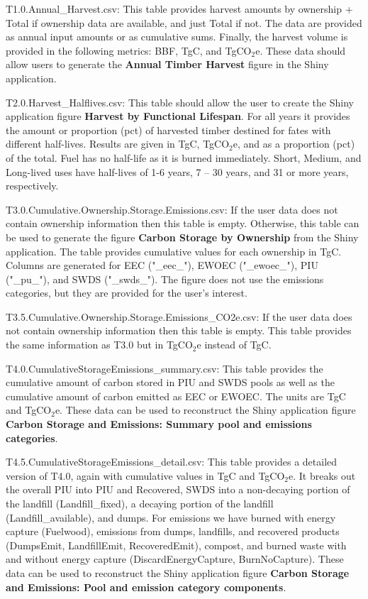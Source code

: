 \documentclass[
  openany]{book}
\begin{document}
T1.0.Annual\_Harvest.csv: This table provides harvest amounts by
ownership + Total if ownership data are available, and just Total if
not. The data are provided as annual input amounts or as cumulative
sums. Finally, the harvest volume is provided in the following metrics:
BBF, TgC, and TgCO\(_2\)e. These data should allow users to generate the
\textbf{Annual Timber Harvest} figure in the Shiny application.

T2.0.Harvest\_Halflives.csv: This table should allow the user to create
the Shiny application figure \textbf{Harvest by Functional Lifespan}.
For all years it provides the amount or proportion (pct) of harvested
timber destined for fates with different half-lives. Results are given
in TgC, TgCO\(_2\)e, and as a proportion (pct) of the total. Fuel has no
half-life as it is burned immediately. Short, Medium, and Long-lived
uses have half-lives of 1-6 years, 7 -- 30 years, and 31 or more years,
respectively.

T3.0.Cumulative.Ownership.Storage.Emissions.csv: If the user data does
not contain ownership information then this table is empty. Otherwise,
this table can be used to generate the figure \textbf{Carbon Storage by
Ownership} from the Shiny application. The table provides cumulative
values for each ownership in TgC. Columns are generated for EEC
("\_eec\_"), EWOEC ("\_ewoec\_"), PIU ("\_pu\_"), and SWDS ("\_swds\_").
The figure does not use the emissions categories, but they are provided
for the user's interest.

T3.5.Cumulative.Ownership.Storage.Emissions\_CO2e.csv: If the user data
does not contain ownership information then this table is empty. This
table provides the same information as T3.0 but in TgCO\(_2\)e instead
of TgC.

T4.0.CumulativeStorageEmissions\_summary.csv: This table provides the
cumulative amount of carbon stored in PIU and SWDS pools as well as the
cumulative amount of carbon emitted as EEC or EWOEC. The units are TgC
and TgCO\(_2\)e. These data can be used to reconstruct the Shiny
application figure \textbf{Carbon Storage and Emissions: Summary pool
and emissions categories}.

T4.5.CumulativeStorageEmissions\_detail.csv: This table provides a
detailed version of T4.0, again with cumulative values in TgC and
TgCO\(_2\)e. It breaks out the overall PIU into PIU and Recovered, SWDS
into a non-decaying portion of the landfill (Landfill\_fixed), a
decaying portion of the landfill (Landfill\_available), and dumps. For
emissions we have burned with energy capture (Fuelwood), emissions from
dumps, landfills, and recovered products (DumpsEmit, LandfillEmit,
RecoveredEmit), compost, and burned waste with and without energy
capture (DiscardEnergyCapture, BurnNoCapture). These data can be used to
reconstruct the Shiny application figure \textbf{Carbon Storage and
Emissions: Pool and emission category components}.
\end{document}
